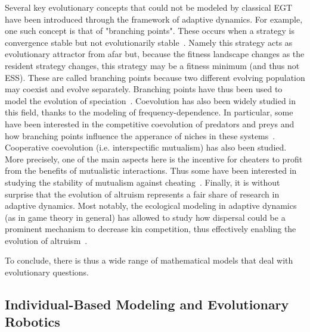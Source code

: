     Several key evolutionary concepts that could not be modeled by classical EGT have been introduced through the framework of adaptive dynamics. For example, one such concept is that of "branching points". These occurs when a strategy is convergence stable but not evolutionarily stable~\parencite{Geritz1998}. Namely this strategy acts as evolutionary attractor from afar but, because the fitness landscape changes as the resident strategy changes, this strategy may be a fitness minimum (and thus not ESS). These are called branching points because two different evolving population may coexist and evolve separately. Branching points have thus been used to model the evolution of speciation~\parencite{Geritz2004}. Coevolution has also been widely studied in this field, thanks to the modeling of frequency-dependence. In particular, some have been interested in the competitive coevolution of predators and preys and how branching points influence the apperance of niches in these systems~\parencite{Bowers2003}. Cooperative coevolution (i.e. interspectific mutualism) has also been studied. More precisely, one of the main aspects here is the incentive for cheaters to profit from the benefits of mutualistic interactions. Thus some have been interested in studying the stability of mutualism against cheating~\parencite{Ferriere2002, McGill2005}. Finally, it is without surprise that the evolution of altruism represents a fair share of research in adaptive dynamics. Most notably, the ecological modeling in adaptive dynamics (as in game theory in general) has allowed to study how dispersal could be a prominent mechanism to decrease kin competition, thus effectively enabling the evolution of altruism~\parencite{LeGalliard2003, LeGalliard2005}.

    To conclude, there is thus a wide range of mathematical models that deal with evolutionary questions.

    

  \subsection{Individual-Based Modeling and Evolutionary Robotics}


